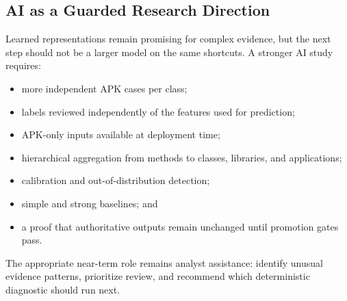 \subsection{AI as a Guarded Research Direction}

Learned representations remain promising for complex \Reight evidence, but
the next step should not be a larger model on the same shortcuts. A stronger
AI study requires:

\begin{itemize}
  \item more independent APK cases per class;
  \item labels reviewed independently of the features used for prediction;
  \item APK-only inputs available at deployment time;
  \item hierarchical aggregation from methods to classes, libraries, and
  applications;
  \item calibration and out-of-distribution detection;
  \item simple and strong baselines; and
  \item a proof that authoritative outputs remain unchanged until promotion
  gates pass.
\end{itemize}

The appropriate near-term role remains analyst assistance: identify unusual
evidence patterns, prioritize review, and recommend which deterministic
diagnostic should run next.
